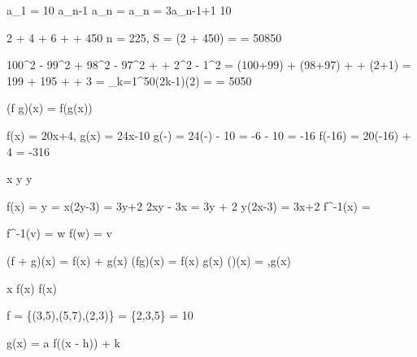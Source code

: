  a_1 = 10 a_{n-1}  a_n =  a_n = 3a_{n-1}+1
10

 2 + 4 + 6 + \cdots + 450\text{:}
n = 225, \quad S = (2 + 450) =  = 50850

100^2 - 99^2 + 98^2 - 97^2 + \cdots + 2^2 - 1^2
= (100+99) + (98+97) + \cdots + (2+1)
= 199 + 195 + \cdots + 3 \quad {}
= \sum_{k=1}^{50}(2k-1)(2) \quad {} =  = 5050


 (f \circ g)(x) = f(g(x))

 f(x) = 20x+4,\; g(x) = 24x-10
g\!\left(-\right) = 24\!\left(-\right) - 10 = -6 - 10 = -16
f(-16) = 20(-16) + 4 = -316

 x  y y

f(x) =  \Rightarrow y = 
\Rightarrow x(2y-3) = 3y+2
\Rightarrow 2xy - 3x = 3y + 2
\Rightarrow y(2x-3) = 3x+2
\Rightarrow f^{-1}(x) = 


f^{-1}(v) = w \iff f(w) = v \quad {}

(f + g)(x) = f(x) + g(x)
(fg)(x) = f(x) \cdot g(x)
\left(\right)(x) = ,\quad g(x) 

 x  f(x) 
 f(x)

 f = \{(3,5),(5,7),(2,3)\} = \{2,3,5\} = 10


 g(x) = a \cdot f\!\left((x - h)\right) + k

